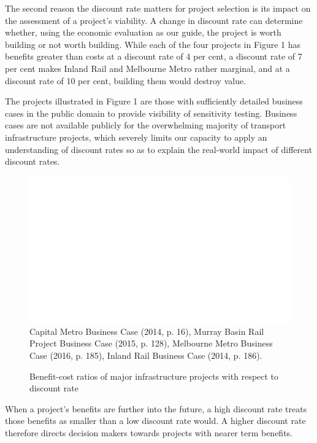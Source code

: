 The second reason the discount rate matters for project selection is its impact on the assessment of a project’s viability. A change in discount rate can determine whether, using the economic evaluation as our guide, the project is worth building or not worth building. While each of the four projects in Figure 1 has benefits greater than costs at a discount rate of 4 per cent, a discount rate of 7 per cent makes Inland Rail and Melbourne Metro rather marginal, and at a discount rate of 10 per cent, building them would destroy value. 

The projects illustrated in Figure 1 are those with sufficiently detailed business cases in the public domain to provide visibility of sensitivity testing. Business cases are not available publicly for the overwhelming majority of transport infrastructure projects, which severely limits our capacity to apply an understanding of discount rates so as to explain the real-world impact of different discount rates.  

\begin{figure}
\caption{Benefit-cost ratios of major infrastructure projects with respect to discount rate \label{<cross-reference key>}}%
\includegraphics[page=4]{Charts/ChartPackDiscountRates.pdf}
%
{Capital Metro Business Case (2014, p. 16), Murray Basin Rail Project Business Case (2015, p. 128), Melbourne Metro Business Case (2016, p. 185), Inland Rail Business Case (2014, p. 186).}
\end{figure}

When a project’s benefits are further into the future, a high discount rate treats those benefits as smaller than a low discount rate would. A higher discount rate therefore directs decision makers towards projects with nearer term benefits. 

